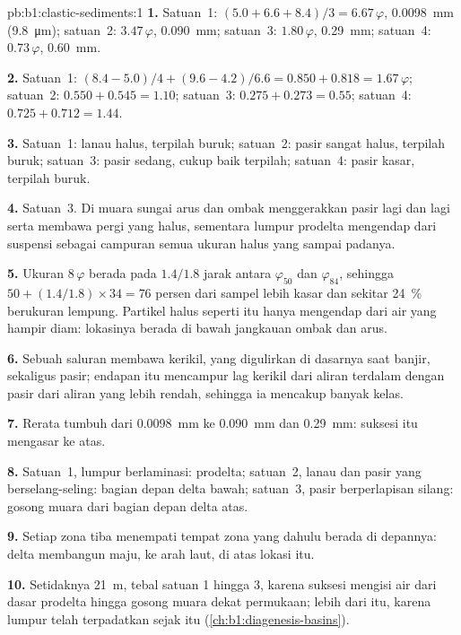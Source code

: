 \begin{solution}{pb:b1:clastic-sediments:1}
\textbf{1.} Satuan~1: $(5.0 + 6.6 + 8.4)/3 = 6.67\,\varphi$, \qty{0.0098}{mm}
(\qty{9.8}{\micro m}); satuan~2: $3.47\,\varphi$, \qty{0.090}{mm}; satuan~3:
$1.80\,\varphi$, \qty{0.29}{mm}; satuan~4: $0.73\,\varphi$, \qty{0.60}{mm}.

\textbf{2.} Satuan~1: $(8.4 - 5.0)/4 + (9.6 - 4.2)/6.6 = 0.850 + 0.818 =
1.67\,\varphi$; satuan~2: $0.550 + 0.545 = 1.10$; satuan~3: $0.275 + 0.273 = 0.55$;
satuan~4: $0.725 + 0.712 = 1.44$.

\textbf{3.} Satuan~1: lanau halus, terpilah buruk; satuan~2: pasir sangat halus, terpilah buruk; satuan~3: pasir sedang, cukup baik terpilah; satuan~4: pasir kasar, terpilah buruk.

\textbf{4.} Satuan~3. Di muara sungai arus dan ombak menggerakkan pasir lagi dan lagi serta membawa pergi yang halus, sementara lumpur prodelta mengendap dari suspensi sebagai campuran semua ukuran halus yang sampai padanya.

\textbf{5.} Ukuran $8\,\varphi$ berada pada $1.4/1.8$ jarak antara
$\varphi_{50}$ dan $\varphi_{84}$, sehingga $50 + (1.4/1.8) \times 34 = 76$ persen dari sampel lebih kasar dan sekitar \qty{24}{\percent} berukuran lempung. Partikel halus seperti itu hanya mengendap dari air yang hampir diam: lokasinya berada di bawah jangkauan ombak dan arus.

\textbf{6.} Sebuah saluran membawa kerikil, yang digulirkan di dasarnya saat banjir, sekaligus pasir; endapan itu mencampur lag kerikil dari aliran terdalam dengan pasir dari aliran yang lebih rendah, sehingga ia mencakup banyak kelas.

\textbf{7.} Rerata tumbuh dari \qty{0.0098}{mm} ke \qty{0.090}{mm} dan \qty{0.29}{mm}: suksesi itu mengasar ke atas.

\textbf{8.} Satuan~1, lumpur berlaminasi: prodelta; satuan~2, lanau dan pasir yang berselang-seling: bagian depan delta bawah; satuan~3, pasir berperlapisan silang: gosong muara dari bagian depan delta atas.

\textbf{9.} Setiap zona tiba menempati tempat zona yang dahulu berada di depannya: delta membangun maju, ke arah laut, di atas lokasi itu.

\textbf{10.} Setidaknya \qty{21}{m}, tebal satuan 1 hingga 3, karena suksesi mengisi air dari dasar prodelta hingga gosong muara dekat permukaan; lebih dari itu, karena lumpur telah terpadatkan sejak itu (\cref{ch:b1:diagenesis-basins}).


\end{solution}
